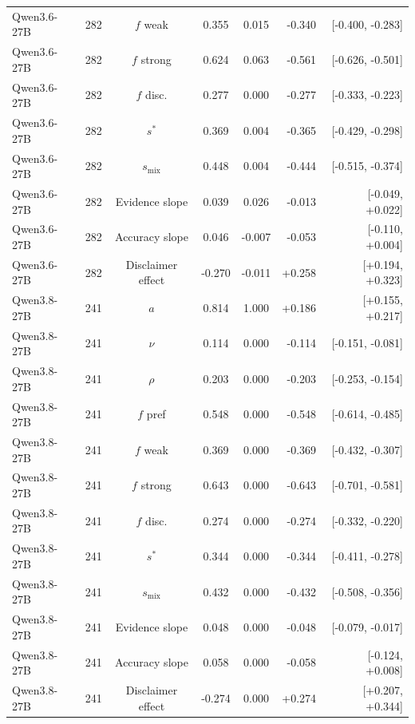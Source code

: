 \documentclass[10pt,a4paper]{article}
\begin{document}
\begin{scriptsize}
\begin{longtable}{llcccrr}
Qwen3.6-27B & 282 & $f$ weak & 0.355 & 0.015 & -0.340 & [-0.400, -0.283] \\
Qwen3.6-27B & 282 & $f$ strong & 0.624 & 0.063 & -0.561 & [-0.626, -0.501] \\
Qwen3.6-27B & 282 & $f$ disc. & 0.277 & 0.000 & -0.277 & [-0.333, -0.223] \\
Qwen3.6-27B & 282 & $s^{*}$ & 0.369 & 0.004 & -0.365 & [-0.429, -0.298] \\
Qwen3.6-27B & 282 & $s_{\mathrm{mix}}$ & 0.448 & 0.004 & -0.444 & [-0.515, -0.374] \\
Qwen3.6-27B & 282 & Evidence slope & 0.039 & 0.026 & -0.013 & [-0.049, +0.022] \\
Qwen3.6-27B & 282 & Accuracy slope & 0.046 & -0.007 & -0.053 & [-0.110, +0.004] \\
Qwen3.6-27B & 282 & Disclaimer effect & -0.270 & -0.011 & +0.258 & [+0.194, +0.323] \\
Qwen3.8-27B & 241 & $a$ & 0.814 & 1.000 & +0.186 & [+0.155, +0.217] \\
Qwen3.8-27B & 241 & $\nu$ & 0.114 & 0.000 & -0.114 & [-0.151, -0.081] \\
Qwen3.8-27B & 241 & $\rho$ & 0.203 & 0.000 & -0.203 & [-0.253, -0.154] \\
Qwen3.8-27B & 241 & $f$ pref & 0.548 & 0.000 & -0.548 & [-0.614, -0.485] \\
Qwen3.8-27B & 241 & $f$ weak & 0.369 & 0.000 & -0.369 & [-0.432, -0.307] \\
Qwen3.8-27B & 241 & $f$ strong & 0.643 & 0.000 & -0.643 & [-0.701, -0.581] \\
Qwen3.8-27B & 241 & $f$ disc. & 0.274 & 0.000 & -0.274 & [-0.332, -0.220] \\
Qwen3.8-27B & 241 & $s^{*}$ & 0.344 & 0.000 & -0.344 & [-0.411, -0.278] \\
Qwen3.8-27B & 241 & $s_{\mathrm{mix}}$ & 0.432 & 0.000 & -0.432 & [-0.508, -0.356] \\
Qwen3.8-27B & 241 & Evidence slope & 0.048 & 0.000 & -0.048 & [-0.079, -0.017] \\
Qwen3.8-27B & 241 & Accuracy slope & 0.058 & 0.000 & -0.058 & [-0.124, +0.008] \\
Qwen3.8-27B & 241 & Disclaimer effect & -0.274 & 0.000 & +0.274 & [+0.207, +0.344] \\
\end{longtable}
\end{scriptsize}
\end{document}
